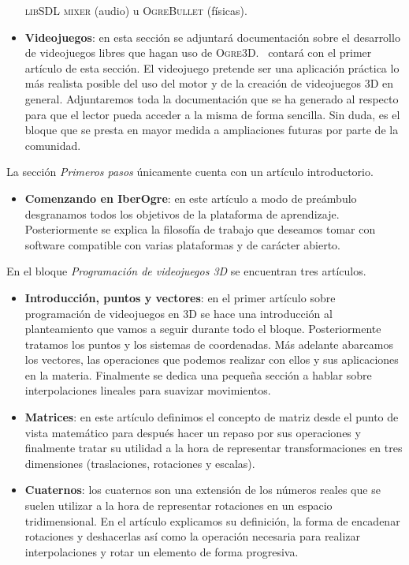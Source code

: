 \begin{itemize}
    \textsc{libSDL mixer} (audio) u \textsc{OgreBullet} (físicas).
    \item \textbf{Videojuegos}: en esta sección se adjuntará documentación
    sobre el desarrollo de videojuegos libres que hagan uso de \textsc{Ogre3D}.
    \juego\ contará con el primer artículo de esta sección. El videojuego pretende
    ser una aplicación práctica lo más realista posible del uso del motor y de la creación
    de videojuegos 3D en general. Adjuntaremos toda la documentación
    que se ha generado al respecto para que el lector pueda acceder a la misma
    de forma sencilla. Sin duda, es el bloque que se presta en mayor medida
    a ampliaciones futuras por parte de la comunidad.
\end{itemize}



La sección \textit{Primeros pasos} únicamente cuenta con un artículo
introductorio.

\begin{itemize}
    \itemsep0em
    \item \textbf{Comenzando en IberOgre}: en este artículo a modo de preámbulo
    desgranamos todos los objetivos de la plataforma de aprendizaje. Posteriormente
    se explica la filosofía de trabajo que deseamos tomar con software compatible
    con varias plataformas y de carácter abierto.
\end{itemize}

En el bloque \textit{Programación de videojuegos 3D} se encuentran tres
artículos.

\begin{itemize}
    \itemsep0em
    \item \textbf{Introducción, puntos y vectores}: en el primer artículo
    sobre programación de videojuegos en 3D se hace una introducción al
    planteamiento que vamos a seguir durante todo el bloque. Posteriormente
    tratamos los puntos y los sistemas de coordenadas. Más adelante abarcamos
    los vectores, las operaciones que podemos realizar con ellos y sus aplicaciones
    en la materia. Finalmente se dedica una pequeña sección a hablar sobre
    interpolaciones lineales para suavizar movimientos.
    \item \textbf{Matrices}: en este artículo definimos el concepto de matriz
    desde el punto de vista matemático para después hacer un repaso por sus
    operaciones y finalmente tratar su utilidad a la hora de representar
    transformaciones en tres dimensiones (traslaciones, rotaciones
    y escalas).
    \item \textbf{Cuaternos}: los cuaternos son una extensión de los números
    reales que se suelen utilizar a la hora de representar rotaciones en un
    espacio tridimensional. En el artículo explicamos su definición, la forma
    de encadenar rotaciones y deshacerlas así como la operación necesaria
    para realizar interpolaciones y rotar un elemento de forma progresiva.
\end{itemize}

